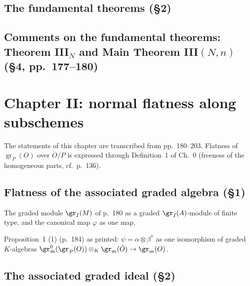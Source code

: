 
\section{The fundamental theorems (\S2)}

\section{Comments on the fundamental theorems: Theorem III$_N$ and Main Theorem III$(N,n)$ (\S4, pp.~177--180)}

\chapter{Chapter II: normal flatness along subschemes}

The statements of this chapter are transcribed from pp.~180--203.  Flatness of $\operatorname{gr}_P(O)$
over $O/P$ is expressed through Definition~1 of Ch.~0 (freeness of the homogeneous parts,
cf.\ p.~136).

\section{Flatness of the associated graded algebra (\S1)}
The graded module $\gr_I(M)$ of p.~180 as a graded $\gr_I(A)$-module of finite type, and the canonical map $\varphi$ as
one map.


Proposition~1 (1) (p.~184) as printed: $\psi=\alpha\otimes\beta^*$ as one isomorphism of graded $K$-algebras
$\gr^0_{\bar m}(\gr_P(O))\otimes_K\gr_{\bar m}(\bar O)\to\gr_m(O)$.

\section{The associated graded ideal (\S2)}

